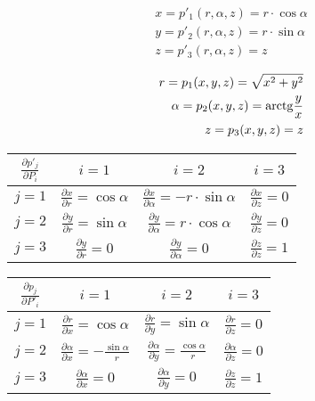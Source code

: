 \begin{equation}
\begin{split}
x = p'_1(r, \alpha, z) = r \cdot \cos \alpha \\
y = p'_2(r, \alpha, z) = r \cdot \sin \alpha \\
z = p'_3(r, \alpha, z) = z
\end{split}
\end{equation}

\begin{equation}
\begin{split}
r = p_1(x, y, z) = \sqrt{x^2 + y^2} \\
\alpha = p_2(x, y, z) = \mathrm{arctg} \frac{y}{x} \\
z = p_3(x, y, z) = z
\end{split}
\end{equation}

\begin{tabular}{| c || c | c | c |}
\hline
\(\frac{\partial p'_j}{\partial P_i}\) & \(i=1\) & \(i=2\) & \(i=3\) \\
\hline
\hline
\(j=1\) & \(\frac{\partial x}{\partial r} = \cos \alpha\) & \(\frac{\partial x}{\partial \alpha} = -r \cdot \sin \alpha\) & \(\frac{\partial x}{\partial z} = 0\) \\
\hline
\(j=2\) & \(\frac{\partial y}{\partial r} = \sin \alpha\) & \(\frac{\partial y}{\partial \alpha} = r \cdot \cos \alpha\) & \(\frac{\partial y}{\partial z} = 0\) \\
\hline
\(j=3\) & \(\frac{\partial y}{\partial r} = 0\) & \(\frac{\partial y}{\partial \alpha} = 0\) & \(\frac{\partial z}{\partial z} = 1\) \\
\hline
\end{tabular}

\begin{tabular}{| c || c | c | c |}
\hline
\(\frac{\partial p_j}{\partial P'_i}\) & \(i=1\) & \(i=2\) & \(i=3\)\\
\hline
\hline
\(j=1\) & \(\frac{\partial r}{\partial x} = \cos \alpha\) & \(\frac{\partial r}{\partial y} = \sin \alpha\) & \(\frac{\partial r}{\partial z} = 0\)\\
\hline
\(j=2\) & \(\frac{\partial \alpha}{\partial x} = -\frac{\sin \alpha}{r}\) & \(\frac{\partial \alpha}{\partial y} = \frac{\cos \alpha}{r}\) & \(\frac{\partial \alpha}{\partial z} = 0\)\\
\hline
\(j=3\) & \(\frac{\partial \alpha}{\partial x} = 0\) & \(\frac{\partial \alpha}{\partial y} = 0\) & \(\frac{\partial z}{\partial z} = 1\)\\
\hline
\end{tabular}

